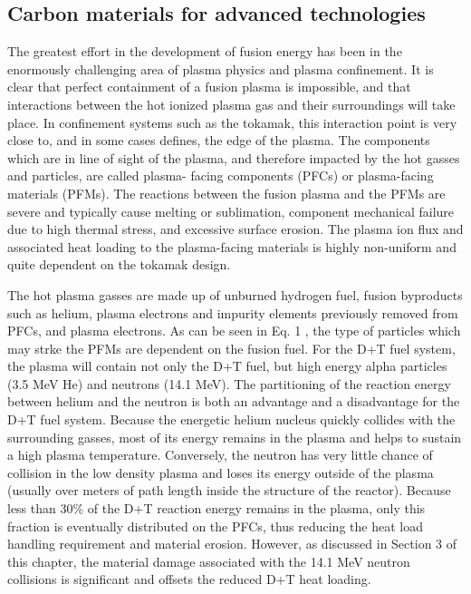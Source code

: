\subsection{Carbon materials for advanced technologies}
The greatest effort in the development of fusion energy has been in the
enormously challenging area of plasma physics and plasma confinement. It is
clear that perfect containment of a fusion plasma is impossible, and that
interactions between the hot ionized plasma gas and their surroundings will
take place. In confinement systems such as the tokamak, this interaction point
is very close to, and in some cases defines, the edge of the plasma. The
components which are in line of sight of the plasma, and therefore impacted by
the hot gasses and particles, are called plasma- facing components (PFCs) or
plasma-facing materials (PFMs). The reactions between the fusion plasma and the
PFMs are severe and typically cause melting or sublimation, component
mechanical failure due to high thermal stress, and 
excessive surface erosion. The plasma ion flux and associated heat loading to
the plasma-facing materials is highly non-uniform and quite dependent on the
tokamak design.

The hot plasma gasses are made up of unburned hydrogen fuel, fusion byproducts 
such as helium, plasma electrons and impurity elements previously removed from 
PFCs, and plasma electrons. As can be seen in Eq. 1
,
 the type of particles which 
may strke the PFMs are dependent on the fusion fuel. For the D+T fuel system, 
the plasma will contain not only the D+T fuel, but high energy alpha particles (3.5 
MeV He) and neutrons (14.1 MeV). The partitioning of the reaction energy 
between helium and the neutron is both an advantage and a disadvantage for the 
D+T fuel system. Because the energetic helium nucleus quickly collides with the 
surrounding gasses, most of its energy remains in the plasma and helps to sustain 
a high plasma temperature. Conversely, the neutron has very little chance of 
collision in the low density plasma and loses its energy outside of the plasma 
(usually over meters of path length inside the structure 
of the reactor). Because less 
than 30\% of the D+T reaction energy remains in the plasma, only this fraction is 
eventually distributed on the PFCs, thus reducing the heat load handling 
requirement and material erosion. However, as discussed in Section 3 of this 
chapter, the material damage associated with the 14.1 MeV neutron collisions is 
significant and offsets the reduced D+T heat loading. 

